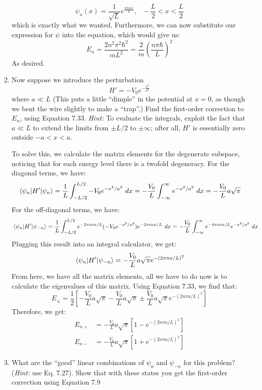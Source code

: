 \documentclass[10pt]{article}
\begin{document}
\begin{enumerate}[label=\alph*)]
\begin{solution}
					\[\psi_n(x) = \frac{1}{\sqrt{L}}e^{\frac{2\pi i n x}{L}}, \ \ \ -\frac{L}{2} < x < \frac{L}{2}\]
					which is exactly what we wanted. Furthermore, we can now substitute our expression for $\psi$ into the \schrodinger equation, which would give us:
					\[E_n = \frac{2n^2\pi^2\hbar^2}{mL^2} = \frac{2}{m}\left(\frac{n\pi\hbar}{L}\right)^2\]
					As desired.
				\end{solution}
		\item Now suppose we introduce the perturbation 
				\[ H' = -V_0 e^{-\frac{x^2}{a^2}}\]
				where $a \ll L$ (This puts a little ``dimple'' in the potential at $x = 0$, as though we bent 
				the wire slightly to make a ``trap''.) Find the first-order correction to $E_n$, using 
				Equation 7.33. \textit{Hint:} To evaluate the integrals, exploit the fact that $a \ll L$
				to extend the limits from $\pm L/2$ to $\pm \infty$; after all, $H'$ is essentially zero outside
				$-a < x < a$.

				\begin{solution}
					To solve this, we calculate the matrix elements for the degenerate subspace, noticing that for each energy level there is a twofold degeneracy. For the diagonal terms, we have: 
					\[ \expval{H'}{\psi_n} = \frac 1L \int_{-L/2}^{L/2} -V_0 e^{-x^2/a^2} \ dx = -\frac{V_0}{L} \int_{-\infty}^\infty e^{-x^2/a^2} \ dx =  -\frac{V_0}{L} a\sqrt{\pi}\]
					For the off-diagonal terms, we have: 
					\[ \mel{\psi_n}{H'}{\psi_{-n}} = \frac 1L \int_{-L/2}^{L/2} e^{-2\pi in x/L} (-V_0 e^{-x^2/a^2}) e^{-2\pi inx/L} \ dx = -\frac{V_0}{L} \int_{-\infty}^\infty e^{-4\pi in x/L} e^{-x^2/a^2} \ dx\]
					Plugging this result into an integral calculator, we get: 
					\[ \mel{\psi_n}{H'}{\psi_{-n}} = -\frac{V_0}{L} a \sqrt{\pi} e^{-(2 \pi n a/L)^2}\]
					From here, we have all the matrix elements, all we have to do now is to calculate the eigenvalues of this matrix. Using Equation 7.33, we find that:
					\[ E_{\pm} = \frac 12 \left[ -\frac{V_0}{L} a\sqrt{\pi} - \frac{V_0}{L} a \sqrt{\pi} \pm \frac{V_0}{L} a\sqrt{\pi} e^{-(2n\pi a/L)^2}\right]\]
					Therefore, we get: 
					\begin{align*}
						E_{n+} &= -\frac{V_0}{L} a\sqrt{\pi} \left[1 - e^{-(2 n \pi a/L)^2}\right]\\
						E_{n-} &= -\frac{V_0}{L} a\sqrt{\pi} \left[1 + e^{-(2 n \pi a/L)^2}\right]
					\end{align*}
				\end{solution}
		\item What are the ``good'' linear combinations of $\psi_n$ and $\psi_{-n}$ for this problem?
				(\textit{Hint:} use Eq. 7.27). Show that with these states you get the first-order correction 
				using Equation 7.9


\end{enumerate}
\end{document}
